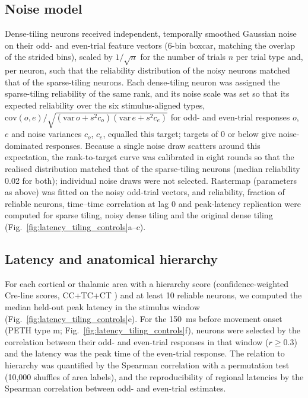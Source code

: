 \documentclass[10pt,lineno]{elife}
\begin{document}
\subsection{Noise model}
Dense-tiling neurons received independent, temporally smoothed Gaussian noise on their odd- and even-trial feature vectors (6-bin boxcar, matching the overlap of the strided bins), scaled by $1/\sqrt{n}$ for the number of trials $n$ per trial type and, per neuron, such that the reliability distribution of the noisy neurons matched that of the sparse-tiling neurons. Each dense-tiling neuron was assigned the sparse-tiling reliability of the same rank, and its noise scale was set so that its expected reliability over the six stimulus-aligned types, $\mathrm{cov}(o,e)/\sqrt{(\mathrm{var}\,o+s^2c_o)(\mathrm{var}\,e+s^2c_e)}$ for odd- and even-trial responses $o$, $e$ and noise variances $c_o$, $c_e$, equalled this target; targets of 0 or below give noise-dominated responses. Because a single noise draw scatters around this expectation, the rank-to-target curve was calibrated in eight rounds so that the realised distribution matched that of the sparse-tiling neurons (median reliability 0.02 for both); individual noise draws were not selected. Rastermap (parameters as above) was fitted on the noisy odd-trial vectors, and reliability, fraction of reliable neurons, time--time correlation at lag 0 and peak-latency replication were computed for sparse tiling, noisy dense tiling and the original dense tiling (Fig.~\ref{fig:latency_tiling_controls}a--c).

\subsection{Latency and anatomical hierarchy}
For each cortical or thalamic area with a hierarchy score (confidence-weighted Cre-line scores, CC+TC+CT \cite{harris2019hierarchical}) and at least 10 reliable neurons, we computed the median held-out peak latency in the stimulus window (Fig.~\ref{fig:latency_tiling_controls}e). For the 150~ms before movement onset (PETH type m; Fig.~\ref{fig:latency_tiling_controls}f), neurons were selected by the correlation between their odd- and even-trial responses in that window ($r\geq0.3$) and the latency was the peak time of the even-trial response. The relation to hierarchy was quantified by the Spearman correlation with a permutation test (10,000 shuffles of area labels), and the reproducibility of regional latencies by the Spearman correlation between odd- and even-trial estimates.
\end{document}
